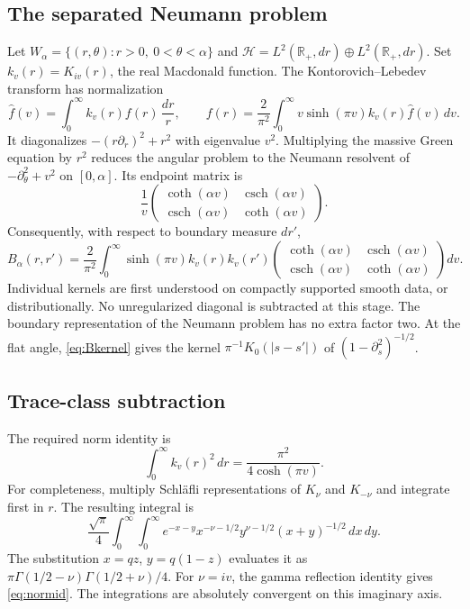 \documentclass[11pt]{amsart}
\numberwithin{equation}{section}
\theoremstyle{remark}
\newcommand{\R}{\mathbb{R}}
\newcommand{\csch}{\operatorname{csch}}
\newcommand{\Hcal}{\mathcal{H}}
\begin{document}
\subsection{The separated Neumann problem}
Let $W_\alpha=\{(r,\theta):r>0,\ 0<\theta<\alpha\}$ and $\Hcal=L^2(\R_+,dr)\oplus L^2(\R_+,dr)$. Set $k_v(r)=K_{iv}(r)$, the real Macdonald function. The Kontorovich--Lebedev transform \cite{DLMF} has normalization
\begin{equation}\label{eq:KL}
\widehat f(v)=\int_0^\infty k_v(r)f(r)\,\frac{dr}{r},\qquad f(r)=\frac{2}{\pi^2}\int_0^\infty v\sinh(\pi v)k_v(r)\widehat f(v)\,dv .
\end{equation}
It diagonalizes $-(r\partial_r)^2+r^2$ with eigenvalue $v^2$. Multiplying the massive Green equation by $r^2$ reduces the angular problem to the Neumann resolvent of $-\partial_\theta^2+v^2$ on $[0,\alpha]$. Its endpoint matrix is
\begin{equation}\label{eq:endpoint}
\frac1v\begin{pmatrix}\coth(\alpha v)&\csch(\alpha v)\\ \csch(\alpha v)&\coth(\alpha v)\end{pmatrix}.
\end{equation}
Consequently, with respect to boundary measure $dr'$,
\begin{equation}\label{eq:Bkernel}
B_\alpha(r,r')=\frac{2}{\pi^2}\int_0^\infty\sinh(\pi v)k_v(r)k_v(r')\begin{pmatrix}\coth(\alpha v)&\csch(\alpha v)\\ \csch(\alpha v)&\coth(\alpha v)\end{pmatrix}dv .
\end{equation}
Individual kernels are first understood on compactly supported smooth data, or distributionally. No unregularized diagonal is subtracted at this stage. The boundary representation of the Neumann problem has no extra factor two. At the flat angle, \eqref{eq:Bkernel} gives the kernel $\pi^{-1}K_0(|s-s'|)$ of $(1-\partial_s^2)^{-1/2}$.

\subsection{Trace-class subtraction}
The required norm identity is
\begin{equation}\label{eq:normid}
\int_0^\infty k_v(r)^2\,dr=\frac{\pi^2}{4\cosh(\pi v)} .
\end{equation}
For completeness, multiply Schl\"afli representations of $K_\nu$ and $K_{-\nu}$ and integrate first in $r$. The resulting integral is
\begin{equation}\label{eq:schlafli}
\frac{\sqrt\pi}{4}\int_0^\infty\!\!\int_0^\infty e^{-x-y}x^{-\nu-1/2}y^{\nu-1/2}(x+y)^{-1/2}\,dx\,dy .
\end{equation}
The substitution $x=qz$, $y=q(1-z)$ evaluates it as $\pi\Gamma(1/2-\nu)\Gamma(1/2+\nu)/4$. For $\nu=iv$, the gamma reflection identity gives \eqref{eq:normid}. The integrations are absolutely convergent on this imaginary axis.
\end{document}
